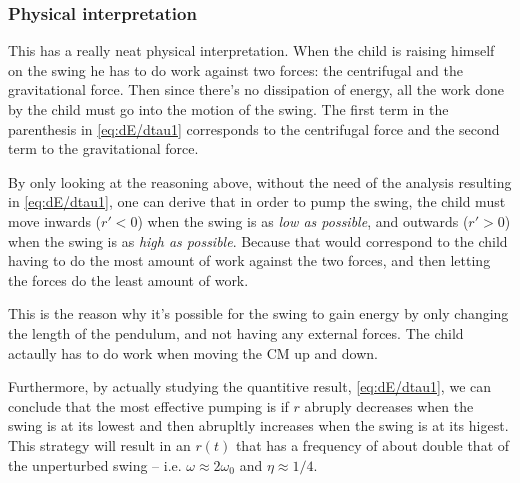 \documentclass[11pt,letter, swedish, english
]{article}
\begin{document}



\subsubsection{Physical interpretation}
This has a really neat physical interpretation. When the child is
raising himself on the swing he has to do work against two forces:
the centrifugal and the gravitational force. Then since there's no
dissipation of energy, all the work done by the child must go into the
motion of the swing. 
The first term in the parenthesis in \eqref{eq:dE/dtau1} corresponds
to the centrifugal force and the second term to the gravitational
force.\footnotemark{}  

By only looking at the reasoning above, without the need of the
analysis resulting in \eqref{eq:dE/dtau1}, one can derive that in
order to pump the swing,
the child must move inwards ($r'<0$) when the swing is as 
\emph{low as possible}, and outwards ($r'>0$) when the swing is as
\emph{high as possible}. 
Because that would correspond to the child having to do the most
amount of work against the two forces, and then letting the forces do
the least amount of work. 

This is the reason why it's possible for the swing to gain energy by
only changing the length of the pendulum, and not having any external
forces. The child actaully has to do work when moving the CM up and
down.

Furthermore, by actually studying the quantitive result,
\eqref{eq:dE/dtau1}, we can conclude that the most effective pumping
is if $r$ abruply decreases when the swing is at its lowest and then
abrupltly increases when the swing is at its higest. This strategy
will result in an $r(t)$ that has a 
frequency of about double that of the unperturbed swing --
i.e. $\omega\approx2\omega_0$ and $\eta\approx1/4$. 
\end{document}
